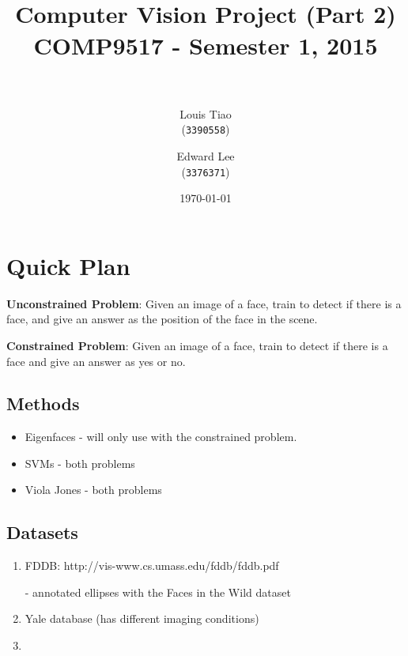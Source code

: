 \documentclass[11pt]{article} %
\title{ 
\normalfont \normalsize 
\horrule{0.5pt} \\[0.4cm] %
\Large Computer Vision Project (Part 2) \\ [0.1cm] %
\large COMP9517 - Semester 1, 2015 \\ [0.2cm]
\horrule{2pt} \\[0.5cm] %
}
\author{
  Louis Tiao \\
  (\texttt{3390558})
  \and
  Edward Lee\\
  (\texttt{3376371})
} %
\date{\normalsize\today} %
\theoremstyle{plain}
\theoremstyle{definition}
\theoremstyle{remark}
\numberwithin{equation}{section} %
\numberwithin{figure}{section} %
\numberwithin{table}{section} %
\begin{document}
\maketitle %

\section{Quick Plan}

\textbf{Unconstrained Problem}: Given an image of a face, train to detect if there is a face, and give an answer as the position of the face in the scene.

\textbf{Constrained Problem}: Given an image of a face, train to detect if there is a face and give an answer as yes or no.

\subsection{Methods}
\begin{itemize}
  \item Eigenfaces - will only use with the constrained problem.
  \item SVMs - both problems
  \item Viola Jones - both problems
\end{itemize}

\subsection{Datasets}
\begin{enumerate}
  \item FDDB: http://vis-www.cs.umass.edu/fddb/fddb.pdf 

    - annotated ellipses with the Faces in the Wild dataset
  \item Yale database (has different imaging conditions)
  \item 
\end{enumerate}
\end{document}
